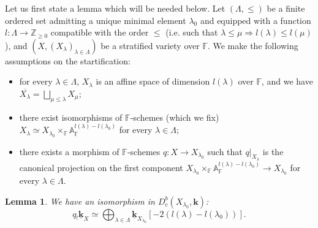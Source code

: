 \documentclass[11pt]{amsart}
\theoremstyle{plain}
\newtheorem{lem}[thm]{Lemma}
\theoremstyle{remark}
\numberwithin{equation}{section}
\begin{document}
	Let us first state a lemma which will be needed below. Let $(\Lambda,\leq)$ be a finite ordered set admitting a unique minimal element $\lambda_0$ and equipped with a function $l:\Lambda\to \mathbb{Z}_{\geq0}$ compatible with the order $\leq$ (i.e. such that $\lambda\leq\mu\Rightarrow l(\lambda)\leq l(\mu)$), and $(X,(X_\lambda)_{\lambda\in\Lambda})$ be a stratified variety over $\mathbb{F}$. We make the following assumptions on the startification:\begin{itemize}
	    \item for every $\lambda\in \Lambda$, $X_\lambda$ is an affine space of dimension $l(\lambda)$ over $\mathbb{F}$, and we have $\overline{X_\lambda}=\bigsqcup_{\mu\leq\lambda}X_\mu$;
	    \item there exist isomorphisms of $\mathbb{F}$-schemes (which we fix) $X_{\lambda}\simeq X_{\lambda_0}\times_{\mathbb{F}} \mathbb{A}_{\mathbb{F}}^{l(\lambda)-l(\lambda_0)}$ for every $\lambda\in\Lambda$;
	    \item there exists a morphism of $\mathbb{F}$-schemes $q:X\to X_{\lambda_0}$ such that $q|_{X_\lambda}$ is the canonical projection on the first component $X_{\lambda_0}\times_{\mathbb{F}} \mathbb{A}_{\mathbb{F}}^{l(\lambda)-l(\lambda_0)}\to X_{\lambda_0}$ for every $\lambda\in \Lambda$.
	\end{itemize}
	\begin{lem}\label{constant sheaf}
		We have an isomorphism in $D_c^b(X_{\lambda_0},\mathbf{k})$:
		$$q_!\underline{\mathbf{k}}_X\simeq \bigoplus_{\lambda\in\Lambda}\underline{\mathbf{k}}_{X_{\lambda_0}}[-2(l(\lambda)-l(\lambda_0))].$$
	\end{lem}
\end{document}
